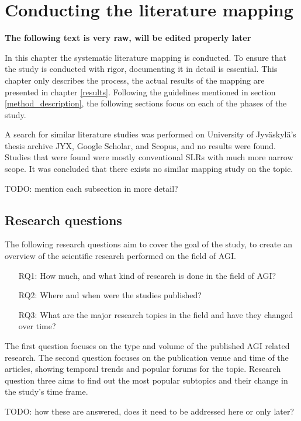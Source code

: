 \documentclass[utf8,english]{gradu3}
\begin{document}
\chapter{Conducting the literature mapping}

\textbf{The following text is very raw, will be edited properly later}

In this chapter the systematic literature mapping is conducted. To ensure that
the study is conducted with rigor, documenting it in detail is essential. This
chapter only describes the process, the actual results of the mapping are
presented in chapter \ref{results}. Following the guidelines mentioned in
section \ref{method_description}, the following sections focus on each of the
phases of the study.

A search for similar literature studies was performed on University of
Jyväskylä's thesis archive JYX, Google Scholar, and Scopus, and no results were
found. Studies that were found were mostly conventional SLRs with much more
narrow scope. It was concluded that there exists no similar mapping study on the
topic.

TODO: mention each subsection in more detail?

\section{Research questions}

The following research questions aim to cover the goal of the study, to create an overview of the scientific research performed on the field of AGI.

\begin{itemize}
  \item[RQ1:] How much, and what kind of research is done in the field of AGI?
  \item[RQ2:] Where and when were the studies published?
  \item[RQ3:] What are the major research topics in the field and have they
        changed over time?
\end{itemize}

The first question focuses on the type and volume of the published AGI related
research. The second question focuses on the publication venue and time of the
articles, showing temporal trends and popular forums for the topic. Research
question three aims to find out the most popular subtopics and their change in the
study's time frame.

TODO: how these are answered, does it need to be addressed here or only later?
\end{document}
